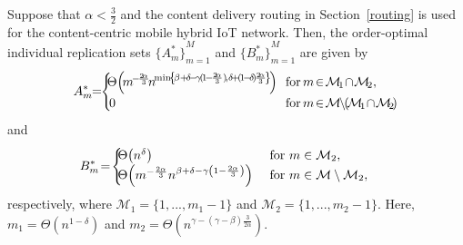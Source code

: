 \documentclass[10pt,journal,compsoc,onecolumn]{IEEEtran}
\begin{document}
\begin{proposition} \label{cache1}
Suppose that $\alpha<\frac{3}{2}$ and the content delivery routing
in Section~\ref{routing} is used for the content-centric mobile hybrid IoT network. Then, the order-optimal individual replication sets
${\lbrace A_m^* \rbrace}^M_{m=1}$ and ${\lbrace B_m^*
\rbrace}^M_{m=1}$ are given by
\begin{equation}\label{M1}
A^{*}_m\!\!=\!\!
  \begin{cases}
       \!\!\Theta\!\left(\!m^{\!-\!\frac{2\!\alpha}{3}}\!n^{\!\min\!\left\lbrace\!\beta+\!\delta\!-\!\gamma\!(\!1\!-\!\frac{2\!\alpha}{3})\!,\delta\!+\!(\!1\!-\!\delta\!)\!\frac{2\!\alpha}{3}\!\right\rbrace}\!\right) & \!\!\textnormal{for\! } m \!\in\!\mathcal{M}\!_1\!\cap\!\mathcal{M}\!_2, \\
   \!0 & \!\!\textnormal{for\! } m \!\in\! \mathcal{M}\!\!\setminus\!\!\left(\!\mathcal{M}\!_1\!\cap\!\mathcal{M}\!_2\!\right)
  \end{cases}
\end{equation}
and
\begin{equation}
\hspace{-0.65cm}
   B^{*}_m\!=\!
  \begin{cases}
      \!\!\Theta\!\left(n^\delta \right) & \textnormal{ for } m \in\mathcal{M}_2,  \\
   \!\!\Theta\!\left(m^{-\frac{2\alpha}{3}}n^{\beta+\delta-\gamma\left(1-\frac{2\alpha}{3}\right)}\right) & \textnormal{ for } m \in \mathcal{M}\setminus\mathcal{M}_2,
  \end{cases}\nonumber
\end{equation}
respectively, where $\mathcal{M}_1 = \lbrace 1,...,m_1-1 \rbrace$ and $\mathcal{M}_2 = \lbrace 1,...,m_2-1 \rbrace$. Here, $m_1=\Theta\left(n^{1-\delta}\right)$ and $m_2=\Theta\left(n^{\gamma-(\gamma-\beta)\frac{3}{2\alpha}}\right)$.
\end{proposition}
\end{document}
